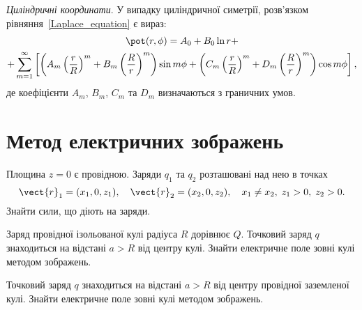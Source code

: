 \begin{Theory}
	\bigskip\textit{Циліндричні координати}. У випадку циліндричної симетрії, розв'язком рівняння~\eqref{Laplace_equation} є вираз:
	\begin{multline}\label{eq:Laplase_Cylindrical}
		\pot(r, \phi) =  A_0 + B_0 \ln r + \\ +\sum\limits_{m = 1}^{\infty} \left[\left(A_m\left( \frac{r}{R}\right)^m + B_m\left( \frac{R}{r}\right)^m\right)\sin m\phi + \left(C_m\left( \frac{r}{R}\right)^m + D_m\left( \frac{R}{r}\right)^m\right)\cos{m\phi} \right],
	\end{multline}
	де коефіцієнти $A_m$, $B_m$, $C_m$ та $D_m$ визначаються з граничних умов.
\end{Theory}

\section{Метод електричних зображень}

\begin{problem}
Площина $z = 0$  є провідною. Заряди $q_1$ та $q_2$ розташовані над нею в точках
\[
	\vect{r}_1 = (x_1, 0, z_1), \quad  \vect{r}_2 = (x_2, 0, z_2), \quad x_1 \ne x_2,\; z_1  > 0, \; z_2  > 0.
\]
Знайти сили, що діють на заряди.

\end{problem}

\begin{problem}
Заряд провідної ізольованої кулі радіуса $R$  дорівнює $Q$. Точковий заряд $q$ знаходиться на відстані  $a > R$ від центру кулі. Знайти електричне поле зовні кулі методом зображень.
\end{problem}

\begin{problem}
Точковий заряд $q$ знаходиться на відстані  $a > R$ від центру провідної заземленої кулі. Знайти електричне поле зовні кулі методом зображень.
\end{problem}

%
%

